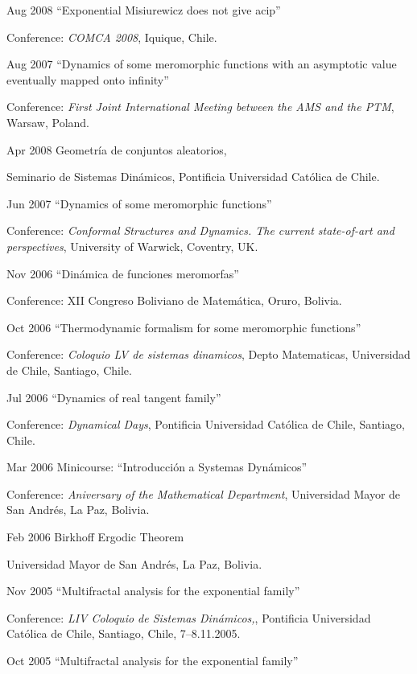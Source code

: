 \documentclass{article}
\begin{document}
\begin{CV}
\item[Aug 2008] ``Exponential Misiurewicz does not give acip''

Conference: {\em COMCA 2008}, Iquique, Chile.

\item[Aug 2007] ``Dynamics of some meromorphic functions with an
  asymptotic value eventually mapped onto infinity''

  Conference: {\em First Joint International Meeting between the AMS
    and the PTM}, Warsaw, Poland.

\item[Apr 2008] Geometría de conjuntos aleatorios,

  Seminario de Sistemas Dinámicos, Pontificia Universidad Cat\'olica
  de Chile.

\item[Jun 2007] ``Dynamics of some meromorphic functions''

  Conference: {\em Conformal Structures and Dynamics. The current
    state-of-art and perspectives}, University of Warwick, Coventry,
  UK.


\item[Nov 2006] ``Dinámica de funciones meromorfas''

  Conference: XII Congreso Boliviano de Matemática, Oruro, Bolivia.
\item[Oct 2006] ``Thermodynamic formalism for some meromorphic functions''

  Conference: {\em Coloquio LV de sistemas dinamicos}, Depto Matematicas,
  Universidad de Chile, Santiago, Chile.
\item[Jul 2006] ``Dynamics of real tangent family'' 

  Conference: {\em Dynamical Days}, Pontificia Universidad Católica de
  Chile, Santiago, Chile.
\item[Mar 2006] Minicourse: ``Introducci{\'o}n a Systemas
  Dyn{\'a}micos''

  Conference: {\em Aniversary of the Mathematical Department},
  Universidad Mayor de San Andr\'es, La Paz, Bolivia.
\item[Feb 2006] Birkhoff Ergodic Theorem

  Universidad Mayor de San Andr\'es, La Paz, Bolivia.
\item[Nov 2005] ``Multifractal analysis for the exponential family'' 

  Conference: {\em LIV Coloquio de Sistemas Din\'amicos,}, Pontificia
  Universidad Católica de Chile, Santiago, Chile, 7--8.11.2005.
\item[Oct 2005] ``Multifractal analysis for the exponential family''


\end{CV}
\end{document}
